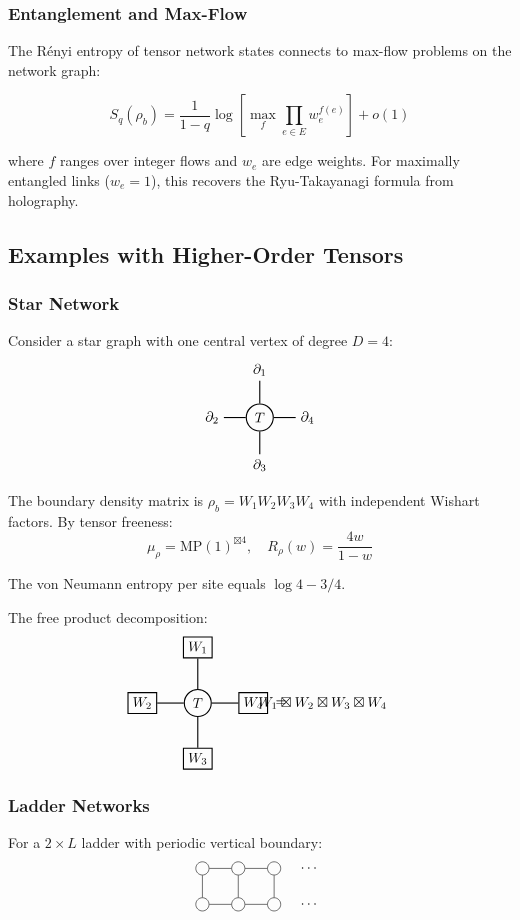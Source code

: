\subsubsection{Entanglement and Max-Flow}

The Rényi entropy of tensor network states connects to max-flow problems on the network graph:

\[
   S_q(\rho_b) = \frac{1}{1-q} \log \left[ \max_f \prod_{e \in E} w_e^{f(e)} \right] + o(1)
\]

where $f$ ranges over integer flows and $w_e$ are edge weights. For maximally entangled links ($w_e = 1$), this recovers the Ryu-Takayanagi formula from holography.

\subsection{Examples with Higher-Order Tensors}

\subsubsection{Star Network}
Consider a star graph with one central vertex of degree $D = 4$:
\[
\begin{tikzpicture}[baseline=0, scale=0.8]
   \node[circle, draw, thick] (C) at (0,0) {$T$};
   \foreach \i in {1,2,3,4} {
      \node (B\i) at (90*\i:1.5) {$\partial_\i$};
      \draw[thick] (C) -- (B\i);
   }
\end{tikzpicture}
\]

The boundary density matrix is $\rho_b = W_1 W_2 W_3 W_4$ with independent Wishart factors. By tensor freeness:
\[
   \mu_{\rho} = \mathrm{MP}(1)^{\boxtimes 4}, \quad R_{\rho}(w) = \frac{4w}{1-w}
\]

The von Neumann entropy per site equals $\log 4 - 3/4$.

The free product decomposition:
\[
\begin{tikzpicture}[baseline=0, scale=0.7]
   \node[circle, draw, thick] (C) at (0,0) {$T$};
   \foreach \i in {1,2,3,4} {
      \node[draw, thick] (W\i) at (90*\i:2) {$W_{\i}$};
      \draw[thick] (C) -- (W\i);
   }
   \node at (3,0) {$=$};
   \node at (4.5,0) {$W_1 \boxtimes W_2 \boxtimes W_3 \boxtimes W_4$};
\end{tikzpicture}
\]

\subsubsection{Ladder Networks}
For a $2 \times L$ ladder with periodic vertical boundary:
\[
\begin{tikzpicture}[baseline=0, scale=0.6]
   \foreach \i in {0,1,2} {
      \node[circle, draw] (T\i) at (1.5*\i,0) {};
      \node[circle, draw] (B\i) at (1.5*\i,-1.5) {};
      \draw (T\i) -- (B\i);
   }
   \node at (4.5,0) {$\cdots$};
   \node at (4.5,-1.5) {$\cdots$};
   \foreach \i in {0,1} {
      \draw (T\i) -- (T\the\numexpr\i+1);
      \draw (B\i) -- (B\the\numexpr\i+1);
   }
\end{tikzpicture}
\]

